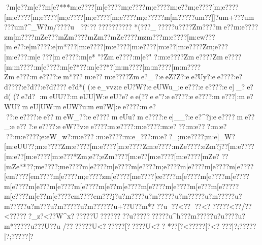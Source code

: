{{{{{{{{{{{{{{{{{{{{{{{{{{{{{{{{{{{{{{{{{{{{{{{{{{{{{{{{{{{{{{{{{{{{{{{{{{{{{{{{{{{{{{{{{{{{{{{{{{{{{{{{{{{{{{{{{{{{{{{{{{{{{{{{{{{{{{{{{{{{{{{{{{{{{{{{{{{{{{{{{{{{{{{{{{{{{{{{{{{{{{{{{{{{{{{{{{{{{{{{{{{{{{{{{{{{{{{{{{{{{{{{{{{{{{{{{{{{{{{{{{{{{{{{{{{{{{{{{{{{{{{{{{{{{{{{{{{{{{{{{{{{{{{{{{{{{{{{{{{{{{{{{{{{{{{{{{{{{{{{{{{{{{{{{{{{{{{{{{{{{{{{{{{{{{{{{{{{{{{{{{{{{{{{{{{{{{{{{{{{{{{{{{{{{{{{{{{{{{{{{{{{{{{{{{{{{{{{{{{{{{{{{{{{{{{{{{{{{{{{{{{{{{{{{{{{{{{{{{{{{{{{{{{{{{{{{{{{{{{{{{{{{{{{{{{{{{{{{{{{{{{{{{{{{{{{{{{{{{{{{{{{{{{{{{{{{{{{{{{{{{{{{{{{{{{{{{{{{{{{{{{{{{{{{{{{{{{{{{{{{{{{{{{{{{{{{{{{{{{{{{{{{{{{{{{{{{{{{{{{{{{{{{{{{{{{{{{{{{{{{{{{{{{{{{{{{{{{{{{{{{{{{{{{{{{{{{{{{{{{{{{{{{{{{{{{{{{{{{{{{{{{{{{{{{{{{{{{{{{{{{{{{{{{{{{{{{{{{{{{{{{{{{{{{{{{{{{{{{{{{{{{{{{{{{{{{{{{{{{{{{{{{{{{{{{{{{{{{{{{{{{{{{{{{{{{{{{{{{{{{{{{{{{{{{{{{{{{{{{{{{{{{?{m[e??{m[e??{m[e?***{m;e????[m[e????{m;e????{m;e????{m;e??{m;e????[m;e????[m;e????[m;e????[m;e????[m;e????[m;e????{m;e?????m[m?????u{m??]]?u{m+???u{m 
???u{m?^_W?}{m/???}?u 
?}?`?? ??????????
*( ???_?????u????Zm????{me??{m:e????zm[m????{mZe???{mZm????{mZm??{mZe????{mzm???{m:e????[m:ew???[me??:e[m????:e[m*???[m:e????[m:e????[m:e????[m:e??[m:e????Zm;e?? ?[m:e???:m[e???[me????:m[e*
"?Zme????:m[e?"
?:m:e????Zme????Zme????[m:m????:m[e????:m[e?*??:m[e??*?[m:m????[m:m????[m:m????Zme???:me????:em*???m:e??m:e????Zme?_?:eeZ?Z?:ee?Uy?:ee????:e?d????:e?d??:e?d????e?d*(
(:ee_vvz:eeU?W?:eeUWu_:ee???:ee????:ee]_?e?d( (?e?d?  :meUU??:meUU]W:eeU?e?ee (??ee "? :ee????:ee????:me???]:me?WU?meU]UW:meUW?u:meu?W]:ee????:me???:ee????:ee??meW_??:ee????meUu?}me????:ee]__?:ee?^?j:ee????me??}_:ee???:ee????:eeW??v:ee????:m:e????:m:e????:m:e???:m:e???:m:e???:m:e????;e:eW_w?:m:e???:m:e????:m:e_???:m:e??_;m:e????;m:e]_W?[m:eUU??;m:e????Zm:e????[m:e????[m:e????Zm:e????:mZe????:eZm?j??[m:e????[m:e??[m:e????[m:e???*Zm;e??;eZm????[m:e??[m:e????[m:e????[mZe?
??[mZe**??;m{e????;m{e????{m[e????{m[e????{m[e????{m;e????{m[e????{m[e????{m[e????[e{m????[e{m????{m[e????{m;e????zm[e????[m{e????[e{e????{m[e????{m[e????{m[e????{m[e????{m[e???{m[e????{m[e????{m[e??{m[e????{m[e????{m[e????{m[e???{m[e?????m[e????{m[e??{m[e????{e{m????{e{m???j?u?m????u?m?????u?m?????u?m?????u?m?????u?m???u?m?????u?m?????}?u+??U?}?m  *???u
??<??}
??<??????\?<??/??\?<?????\??_z?<??}W^x???}???U??}??????u?????}?  ???}?u^h??}?m?????u?u????u?m*????}?u???U?}?u
/????}???U<??????[?????U<??
*??[?<?????[?<?
???|?;?????|?;?????[?\?
}}}}}}}}}}}}}}}}}}}}}}}}}}}}}}}}}}}}}}}}}}}}}}}}}}}}}}}}}}}}}}}}}}}}}}}}}}}}}}}}}}}}}}}}}}}}}}}}}}}}}}}}}}}}}}}}}}}}}}}}}}}}}}}}}}}}}}}}}}}}}}}}}}}}}}}}}}}}}}}}}}}}}}}}}}}}}}}}}}}}}}}}}}}}}}}}}}}}}}}}}}}}}}}}}}}}}}}}}}}}}}}}}}}}}}}}}}}}}}}}}}}}}}}}}}}}}}}}}}}}}}}}}}}}}}}}}}}}}}}}}}}}}}}}}}}}}}}}}}}}}}}}}}}}}}}}}}}}}}}}}}}}}}}}}}}}}}}}}}}}}}}}}}}}}}}}}}}}}}}}}}}}}}}}}}}}}}}}}}}}}}}}}}}}}}}}}}}}}}}}}}}}}}}}}}}}}}}}}}}}}}}}}}}}}}}}}}}}}}}}}}}}}}}}}}}}}}}}}}}}}}}}}}}}}}}}}}}}}}}}}}}}}}}}}}}}}}}}}}}}}}}}}}}}}}}}}}}}}}}}}}}}}}}}}}}}}}}}}}}}}}}}}}}}}}}}}}}}}}}}}}}}}}}}}}}}}}}}}}}}}}}}}}}}}}}}}}}}}}}}}}}}}}}}}}}}}}}}}}}}}}}}}}}}}}}}}}}}}}}}}}}}}}}}}}}}}}}}}}}}}}}}}}}}}}}}}}}}}}}}}}}}}}}}}}}}}}}}}}}}}}}}}}}}}}}}}}}}}}}}}}}}}}}}}}}}}}}}}}}}}}}}}}}}}}}}}}}}}}}}}}}}}}}}}}}}}}}}}}}}}}}}}}}}}}}}}}}}}}}}}}}}}}}}}}}}}}}}}}}}}}}}}}}}}}}}}}}}}}}}}}}}}}}}}}}}}}}}}}}}}}}}}}}}}}}}}}}}}}}}}}}}
